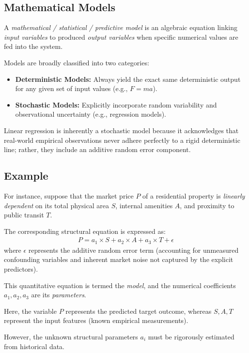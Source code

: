 \subsection{Mathematical Models}
A \emph{mathematical / statistical / predictive model} is an algebraic equation linking \emph{input variables} to produced \emph{output variables} when specific numerical values are fed into the system.

Models are broadly classified into two categories:
\begin{itemize}
	\item \textbf{Deterministic Models:} Always yield the exact same deterministic output for any given set of input values (e.g., $F = ma$).
	\item \textbf{Stochastic Models:} Explicitly incorporate random variability and observational uncertainty (e.g., regression models).
\end{itemize}

Linear regression is inherently a stochastic model because it acknowledges that real-world empirical observations never adhere perfectly to a rigid deterministic line; rather, they include an additive random error component.

\subsection{Example}
For instance, suppose that the market price $P$ of a residential property is \emph{linearly dependent} on its total physical area $S$, internal amenities $A$, and proximity to public transit $T$.

The corresponding structural equation is expressed as:
\begin{align}
	P = a_1 \times S + a_2 \times A + a_3 \times T + \epsilon
\end{align}
where $\epsilon$ represents the additive random error term (accounting for unmeasured confounding variables and inherent market noise not captured by the explicit predictors).

This quantitative equation is termed the \emph{model}, and the numerical coefficients $a_1, a_2, a_3$ are its \emph{parameters}.

Here, the variable $P$ represents the predicted target outcome, whereas $S, A, T$ represent the input features (known empirical measurements).

However, the unknown structural parameters $a_i$ must be rigorously estimated from historical data.


